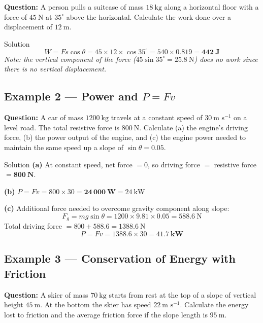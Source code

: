 \textbf{Question:} A person pulls a suitcase of mass $18\ \text{kg}$ along a horizontal floor with a force of $45\ \text{N}$ at $35^\circ$ above the horizontal. Calculate the work done over a displacement of $12\ \text{m}$.

\begin{examplebox}{Solution}
$$W = Fs\cos\theta = 45 \times 12 \times \cos 35^\circ = 540 \times 0.819 = \mathbf{442\ \text{J}}$$
\textit{Note: the vertical component of the force ($45\sin35^\circ = 25.8\ \text{N}$) does no work since there is no vertical displacement.}
\end{examplebox}

\subsection*{Example 2 — Power and \texorpdfstring{$P = Fv$}{P = Fv}}

\textbf{Question:} A car of mass $1200\ \text{kg}$ travels at a constant speed of $30\ \text{m s}^{-1}$ on a level road. The total resistive force is $800\ \text{N}$. Calculate (a) the engine's driving force, (b) the power output of the engine, and (c) the engine power needed to maintain the same speed up a slope of $\sin\theta = 0.05$.

\begin{examplebox}{Solution}
\textbf{(a)} At constant speed, net force $= 0$, so driving force $= $ resistive force $= \mathbf{800\ \text{N}}$.

\vspace{0.3em}
\textbf{(b)} $P = Fv = 800 \times 30 = \mathbf{24\,000\ \text{W}} = 24\ \text{kW}$

\vspace{0.3em}
\textbf{(c)} Additional force needed to overcome gravity component along slope:
$$F_g = mg\sin\theta = 1200 \times 9.81 \times 0.05 = 588.6\ \text{N}$$
Total driving force $= 800 + 588.6 = 1388.6\ \text{N}$
$$P = Fv = 1388.6 \times 30 = \mathbf{41.7\ \text{kW}}$$
\end{examplebox}

\subsection*{Example 3 — Conservation of Energy with Friction}

\textbf{Question:} A skier of mass $70\ \text{kg}$ starts from rest at the top of a slope of vertical height $45\ \text{m}$. At the bottom the skier has speed $22\ \text{m s}^{-1}$. Calculate the energy lost to friction and the average friction force if the slope length is $95\ \text{m}$.

